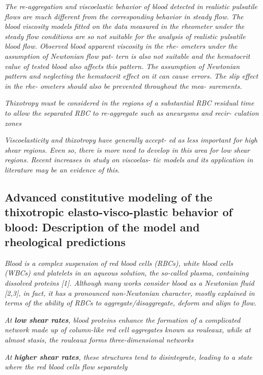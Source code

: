 \documentclass[11pt,letterpaper]{article}
\begin{document}
\textit{The  re-aggregation and  viscoelastic behavior of  blood detected in  realistic pulsatile flows are  much  different from  the corresponding behavior  in steady  flow. The blood viscosity models fitted on the  data measured in the rheometer under the steady flow conditions are so not suitable for the  analysis of  realistic  pulsatile blood flow. Observed blood apparent  viscosity in  the rhe- ometers under the assumption of Newtonian flow pat- tern is also not suitable and the hematocrit value of tested blood also affects this pattern. The assumption of Newtonian pattern and  neglecting the  hematocrit effect on  it can cause  errors. The  slip effect  in  the rhe- ometers  should also be  prevented throughout  the mea- surements.}

\textit{Thixotropy must be  considered  in the regions  of  a substantial RBC residual  time  to allow the  separated RBC to  re-aggregate  such as aneurysms and  recir- culation zones}

\textit{Viscoelasticity  and thixotropy  have generally accept- ed  as  less important for high shear  regions. Even  so, there is more need  to develop in this area  for  low shear  regions. Recent  increases in  study on viscoelas- tic models  and its application in literature may be an evidence of this.}



\newpage
\subsection{Advanced constitutive modeling of the thixotropic elasto-visco-plastic behavior of blood: Description of the model and rheological predictions}


\textit{Blood is a complex suspension of red blood cells (RBCs), white blood cells (WBCs) and platelets
in an aqueous solution, the so-called plasma, containing dissolved proteins [1]. Although many works
consider blood as a Newtonian fluid [2,3], in fact, it has a pronounced non-Newtonian character,
mostly explained in terms of the ability of RBCs to aggregate/disaggregate, deform and align to
flow.}


\textit{At \textbf{low shear rates}, blood proteins enhance the formation of a complicated network made up of column-like red cell aggregates known as rouleaux, while at almost stasis, the rouleaux forms three-dimensional networks}

\textit{At \textbf{higher shear rates}, these structures tend to disintegrate, leading to a state where the red blood cells flow separately}
\end{document}
